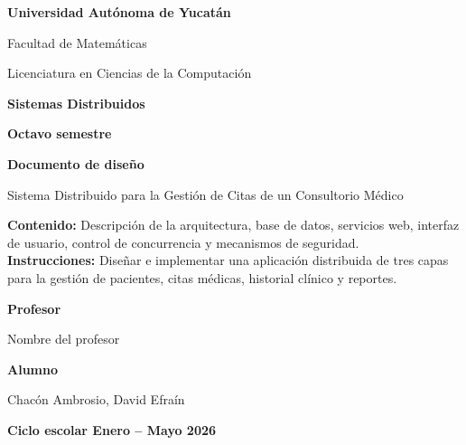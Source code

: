 \documentclass[12pt]{article}
\begin{document}
\begin{titlepage}
    \centering

    {\Large \textbf{Universidad Autónoma de Yucatán}}\par
    \vspace{0.25cm}
    {\large Facultad de Matemáticas}\par
    \vspace{0.25cm}
    {\large Licenciatura en Ciencias de la Computación}\par

    \vspace{0.8cm}

    {\large \textbf{Sistemas Distribuidos}}\par
    \vspace{0.25cm}
    {\large \textbf{Octavo semestre}}\par

    \vspace{0.9cm}

    {\Large \textbf{Documento de diseño}}\par
    \vspace{0.25cm}
    {\large Sistema Distribuido para la Gestión de Citas de un Consultorio Médico}\par

    \vspace{0.9cm}

    \begin{minipage}{0.92\textwidth}
        \setlength{\parindent}{0pt}
        \textbf{Contenido:} Descripción de la arquitectura, base de datos, servicios web, interfaz de usuario, control de concurrencia y mecanismos de seguridad.\\
        \textbf{Instrucciones:} Diseñar e implementar una aplicación distribuida de tres capas para la gestión de pacientes, citas médicas, historial clínico y reportes.
    \end{minipage}

    \vspace{0.9cm}

    {\normalsize \textbf{Profesor}}\par
    \vspace{0.1cm}
    {\normalsize Nombre del profesor}\par
    \vspace{0.35cm}

    {\normalsize \textbf{Alumno}}\par
    \vspace{0.1cm}
    {\normalsize Chacón Ambrosio, David Efraín}\par
    \vspace{0.35cm}

    {\normalsize \textbf{Ciclo escolar Enero -- Mayo 2026}}\par

    \vfill
\end{titlepage}
\end{document}
